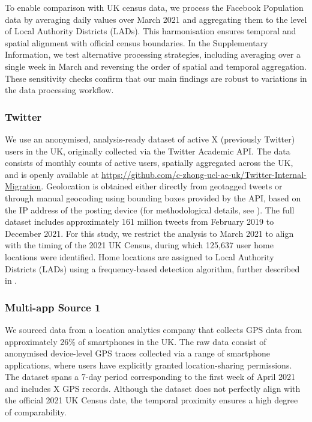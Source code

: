 \documentclass[]{rsos}%
\begin{document}
To enable comparison with UK census data, we process the Facebook Population data by averaging daily values over March 2021 and aggregating them to the level of Local Authority Districts (LADs). This harmonisation ensures temporal and spatial alignment with official census boundaries. In the Supplementary Information, we test alternative processing strategies, including averaging over a single week in March and reversing the order of spatial and temporal aggregation. These sensitivity checks confirm that our main findings are robust to variations in the data processing workflow.

\hypertarget{twitter}{%
\subsubsection{Twitter}\label{twitter}}

We use an anonymised, analysis-ready dataset of active
X (previously Twitter) users in the UK, originally collected via the Twitter Academic API. The data consists of monthly counts of active users, spatially aggregated across the UK, and is openly available at \url{https://github.com/c-zhong-ucl-ac-uk/Twitter-Internal-Migration}. Geolocation is obtained either directly from geotagged tweets or through manual geocoding using bounding boxes provided by the API, based on the IP address of the posting device (for methodological details, see \citep{wang2022}). The full dataset includes approximately 161 million tweets from
February 2019 to December 2021. For this study, we restrict the analysis to March 2021 to align with the timing of the 2021 UK Census, during which 125,637 user home locations were identified. Home locations are assigned to Local Authority Districts (LADs) using a frequency-based detection algorithm, further described in \citep{wang2022}.

\hypertarget{multi-app-source-1}{%
\subsubsection{Multi-app Source 1}\label{multi-app-source-1}}

We sourced data from a location analytics company that collects GPS data from approximately 26\% of smartphones in the UK. The raw data consist of anonymised device-level GPS traces collected via a range of smartphone applications, where users have explicitly granted location-sharing permissions. The dataset spans a 7-day period corresponding to the first week of April 2021 and includes X GPS records. Although the dataset does not perfectly align with the official 2021 UK Census date, the temporal proximity ensures a high degree of comparability.
\end{document}
